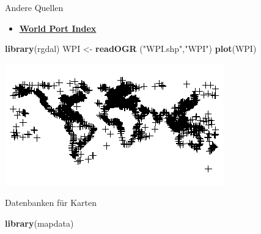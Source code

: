 \documentclass[ignorenonframetext,]{beamer}
\newenvironment{Shaded}{\begin{snugshade}}{\end{snugshade}}
\newcommand{\KeywordTok}[1]{\textcolor[rgb]{0.13,0.29,0.53}{\textbf{#1}}}
\newcommand{\NormalTok}[1]{#1}
\newcommand{\StringTok}[1]{\textcolor[rgb]{0.31,0.60,0.02}{#1}}
\providecommand{\tightlist}{%
  \setlength{\itemsep}{0pt}\setlength{\parskip}{0pt}}
\begin{document}
\begin{frame}[fragile]{Andere Quellen}
\protect\hypertarget{andere-quellen}{}

\begin{itemize}
\tightlist
\item
  \href{http://msi.nga.mil/NGAPortal/MSI.portal?_nfpb=true\&_pageLabel=msi_portal_page_62\&pubCode=0015}{\textbf{World
  Port Index}}
\end{itemize}

\begin{Shaded}
\begin{Highlighting}[]
\KeywordTok{library}\NormalTok{(rgdal)}
\NormalTok{WPI <-}\StringTok{ }\KeywordTok{readOGR}\NormalTok{ (}\StringTok{"WPI.shp"}\NormalTok{,}\StringTok{"WPI"}\NormalTok{)}
\KeywordTok{plot}\NormalTok{(WPI)}
\end{Highlighting}
\end{Shaded}

\includegraphics{figure/WPI.png}

Datenbanken für Karten

\begin{Shaded}
\begin{Highlighting}[]
\KeywordTok{library}\NormalTok{(mapdata)}
\end{Highlighting}
\end{Shaded}

\end{frame}
\end{document}
